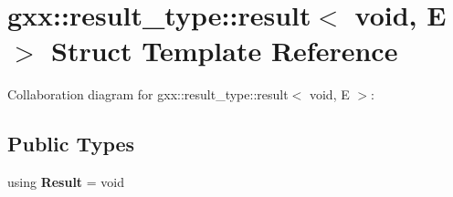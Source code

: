 \hypertarget{structgxx_1_1result__type_1_1result_3_01void_00_01E_01_4}{}\section{gxx\+:\+:result\+\_\+type\+:\+:result$<$ void, E $>$ Struct Template Reference}
\label{structgxx_1_1result__type_1_1result_3_01void_00_01E_01_4}


Collaboration diagram for gxx\+:\+:result\+\_\+type\+:\+:result$<$ void, E $>$\+:
\subsection*{Public Types}
\begin{DoxyCompactItemize}
\item 
using {\bfseries Result} = void\hypertarget{structgxx_1_1result__type_1_1result_3_01void_00_01E_01_4_aeec0e13b6afbe283afb57252505f433d}{}\label{structgxx_1_1result__type_1_1result_3_01void_00_01E_01_4_aeec0e13b6afbe283afb57252505f433d}

\end{DoxyCompactItemize}
